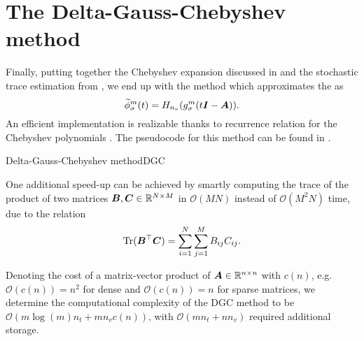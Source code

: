 
\section{The Delta-Gauss-Chebyshev method}
\label{sec:2-chebyshev-delta-gauss-chebyshev}

Finally, putting together the 
Chebyshev expansion discussed in  and 
the stochastic trace estimation from ,
we end up with the  method \cite[Algorithm~2]{lin2017randomized}
which approximates the  as
\begin{equation}
    \widetilde{\phi}_{\sigma}^m(t) = H_{n_v}(g_{\sigma}^m(t\boldsymbol{I} - \boldsymbol{A})).
    \label{equ:2-chebyshev-DGC-final-estimator}
\end{equation}
An efficient implementation is realizable thanks to recurrence relation for the
Chebyshev polynomials . The pseudocode
for this method can be found in .

\begin{algo}{Delta-Gauss-Chebyshev method}{DGC}
    
\end{algo}

One additional speed-up can be achieved by smartly computing the trace of the 
product of two matrices $\boldsymbol{B}, \boldsymbol{C} \in \mathbb{R}^{N \times M}$ in
$\mathcal{O}(MN)$ instead of $\mathcal{O}(M^2N)$ time, due to the relation
\begin{equation}
    \operatorname{Tr}(\boldsymbol{B}^{\top}\boldsymbol{C}) = \sum_{i=1}^{N} \sum_{j=1}^{M} B_{ij} C_{ij}.
    \label{equ:2-chebyshev-fast-trace}
\end{equation}

Denoting the cost of a matrix-vector product of $\boldsymbol{A} \in \mathbb{R}^{n \times n}$
with $c(n)$, e.g. $\mathcal{O}(c(n)) = n^2$ for dense and
$\mathcal{O}(c(n)) = n$ for sparse matrices, we determine the computational
complexity of the \gls{DGC} method to be $\mathcal{O}(m \log(m) n_t + m n_v c(n))$,
with $\mathcal{O}(m n_t + n n_v)$ required additional storage.
